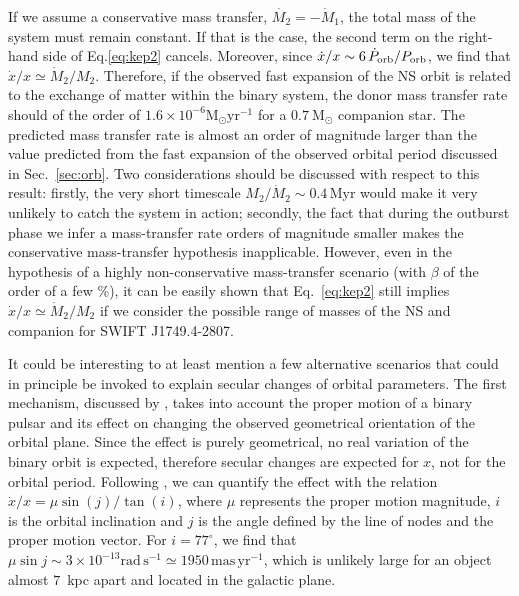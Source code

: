 \documentclass[fleqn,usenatbib]{mnras}
\newcommand{\swiftj}{SWIFT J1749.4-2807}
\begin{document}
If we assume a conservative mass transfer, $\dot{M_2}=-\dot{M}_1$, the total mass of the system must remain constant. If that is the case, the second term on the right-hand side of Eq.\ref{eq:kep2} cancels. Moreover, since $\dot{x}/{x} \sim 6\,\dot{P}_{\rm orb}/P_{\rm orb}$, we find that $\dot{x}/{x}\simeq \dot{M}_2/{M_2}$. Therefore, if the observed fast expansion of the NS orbit is related to the exchange of matter within the binary system, the donor mass transfer rate should of the order of $1.6\times 10^{-6}\text{M}_{\odot} \text{yr}^{-1}$ for a $0.7~\text{M}_{\odot}$ companion star. The predicted mass transfer rate is almost an order of magnitude larger than the value predicted from the fast expansion of the observed orbital period discussed in Sec.~\ref{sec:orb}. Two considerations should be discussed with respect to this result: firstly, the very short timescale $M_2/\dot{M}_2\sim0.4\,\text{Myr}$ would make it very unlikely to catch the system in action; secondly, the fact that during the outburst phase we infer a mass-transfer rate orders of magnitude smaller makes the conservative mass-transfer hypothesis inapplicable. However, even in the hypothesis of a highly non-conservative mass-transfer scenario (with $\beta$ of the order of a few \%), it can be easily shown that Eq.~\ref{eq:kep2} still implies $\dot{x}/{x}\simeq \dot{M}_2/{M_2}$ if we consider the possible range of masses of the NS and companion for \swiftj{}. 

It could be interesting to at least mention a few alternative scenarios that could in principle be invoked to explain secular changes of orbital parameters. The first mechanism, discussed by \citet{Kopeikin:1996wy}, takes into account the proper motion of a binary pulsar and its effect on changing the observed geometrical orientation of the orbital plane. Since the effect is purely geometrical, no real variation of the binary orbit is expected, therefore secular changes are expected for $x$, not for the orbital period. Following \citet{Arzoumanian:1996up}, we can quantify the effect with the relation $\dot{x}/x=\mu \sin{(j)}/\tan{(i)}$, where $\mu$ represents the proper motion magnitude, $i$ is the orbital inclination and $j$ is the angle defined by the line of nodes and the proper motion vector. For $i=77^{\circ}$, we find that $\mu \sin j\sim 3\times 10^{-13} \text{rad}\, \text{s}^{-1}\simeq 1950\,\text{mas}\, \text{yr}^{-1}$, which is unlikely large for an object almost $7$~kpc apart and located in the galactic plane. 
\end{document}
